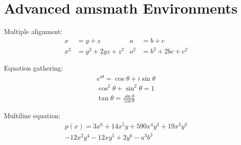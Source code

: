 \documentclass{article}
\begin{document}
\section*{Advanced amsmath Environments}

Multiple alignment:
\begin{align*}
x &= y + z & a &= b + c \\
x^2 &= y^2 + 2yz + z^2 & a^2 &= b^2 + 2bc + c^2
\end{align*}

Equation gathering:
\begin{gather*}
e^{i\theta} = \cos\theta + i\sin\theta \\
\cos^2\theta + \sin^2\theta = 1 \\
\tan\theta = \frac{\sin\theta}{\cos\theta}
\end{gather*}

Multiline equation:
\begin{multline*}
p(x) = 3x^6 + 14x^5y + 590x^4y^2 + 19x^3y^3 \\ 
- 12x^2y^4 - 12xy^5 + 2y^6 - a^3b^3
\end{multline*}
\end{document}

